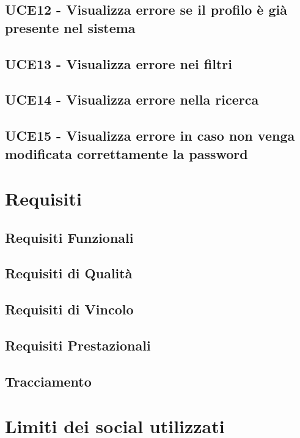 \documentclass[a4paper]{article}
\begin{document}
	\subsection{UCE12 - Visualizza errore se il profilo è già presente nel sistema}
	
	
	\subsection{UCE13 - Visualizza errore nei filtri}
	
	
	\subsection{UCE14 - Visualizza errore nella ricerca}
	
	
	\subsection{UCE15 - Visualizza errore in caso non venga modificata correttamente la password}
	

	\newpage	
	
	\section{Requisiti}
	
	
	\subsection{Requisiti Funzionali}
	
	
	\subsection{Requisiti di Qualità}
	
	
	\subsection{Requisiti di Vincolo}
	
	
	\subsection{Requisiti Prestazionali}
		
	
	\subsection{Tracciamento}
		
	\newpage

	\section{Limiti dei social utilizzati}
	
	
\end{document}

